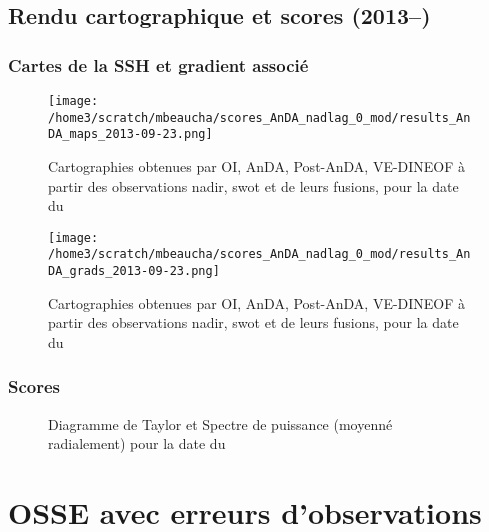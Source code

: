\documentclass[fleqn]{report}
\begin{document}
\subsection{Rendu cartographique et scores (2013--) } 

\subsubsection{Cartes de la SSH et gradient associé}

\begin{figure}[H]
  \hspace{-2cm}\texttt{[image: /home3/scratch/mbeaucha/scores\_AnDA\_nadlag\_0\_mod/results\_AnDA\_maps\_2013-09-23.png]}
  \caption{Cartographies obtenues par OI, AnDA, Post-AnDA, VE-DINEOF à partir des observations nadir, swot et de leurs fusions, pour la date du }
\end{figure} 

\begin{figure}[H]
  \hspace{-2cm}\texttt{[image: /home3/scratch/mbeaucha/scores\_AnDA\_nadlag\_0\_mod/results\_AnDA\_grads\_2013-09-23.png]}
  \caption{Cartographies obtenues par OI, AnDA, Post-AnDA, VE-DINEOF à partir des observations nadir, swot et de leurs fusions, pour la date du }
\end{figure}


\subsubsection{Scores}

\begin{figure}[H]
  \centering
  \hfill
  \caption{Diagramme de Taylor et Spectre de puissance (moyenné radialement) pour la date du }
\end{figure} 

\section{OSSE avec erreurs d'observations}
\end{document}
